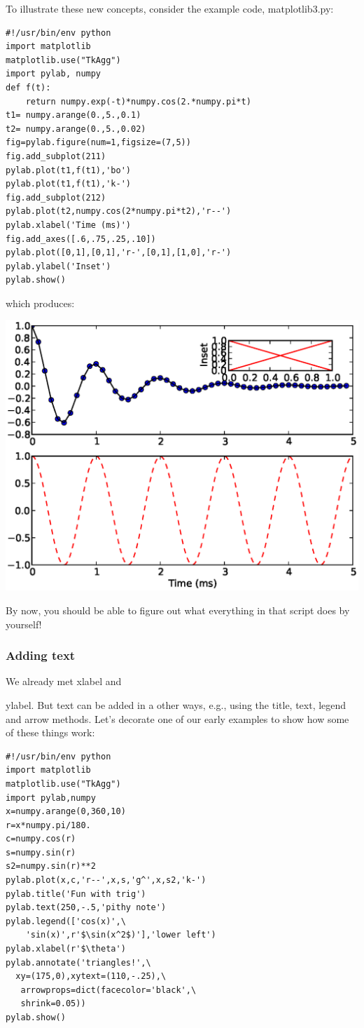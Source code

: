 \documentclass[11pt]{book}
\begin{document}
{{{{To illustrate these new concepts, consider the example code, {\color{blue}matplotlib3.py}:

{ \color{blue} \begin{verbatim}
#!/usr/bin/env python
import matplotlib
matplotlib.use("TkAgg")
import pylab, numpy
def f(t):
    return numpy.exp(-t)*numpy.cos(2.*numpy.pi*t)
t1= numpy.arange(0.,5.,0.1)
t2= numpy.arange(0.,5.,0.02)
fig=pylab.figure(num=1,figsize=(7,5)) 
fig.add_subplot(211) 
pylab.plot(t1,f(t1),'bo')
pylab.plot(t1,f(t1),'k-') 
fig.add_subplot(212) 
pylab.plot(t2,numpy.cos(2*numpy.pi*t2),'r--')
pylab.xlabel('Time (ms)')
fig.add_axes([.6,.75,.25,.10])
pylab.plot([0,1],[0,1],'r-',[0,1],[1,0],'r-')
pylab.ylabel('Inset')
pylab.show()
\end{verbatim}}

\noindent which produces:

{\includegraphics[width=15cm]{EPSfiles/matplotlib3.eps}}

\noindent By now, you should be able to figure out what everything in that script does by yourself!  

\subsubsection{Adding text}

We already met {\color{blue}xlabel} and {{\color{blue}ylabel}.  But text can be added in a other ways, e.g., using the  title, text, legend and arrow methods.
Let's decorate one of our early examples to show how some of these things work:

{ \color{blue} \begin{verbatim}
#!/usr/bin/env python
import matplotlib
matplotlib.use("TkAgg")
import pylab,numpy
x=numpy.arange(0,360,10)
r=x*numpy.pi/180.
c=numpy.cos(r)
s=numpy.sin(r)
s2=numpy.sin(r)**2
pylab.plot(x,c,'r--',x,s,'g^',x,s2,'k-')
pylab.title('Fun with trig')
pylab.text(250,-.5,'pithy note')
pylab.legend(['cos(x)',\
    'sin(x)',r'$\sin(x^2$)'],'lower left')
pylab.xlabel(r'$\theta')
pylab.annotate('triangles!',\
  xy=(175,0),xytext=(110,-.25),\
   arrowprops=dict(facecolor='black',\
   shrink=0.05))
pylab.show()
\end{verbatim}}

}}}}}
\end{document}
